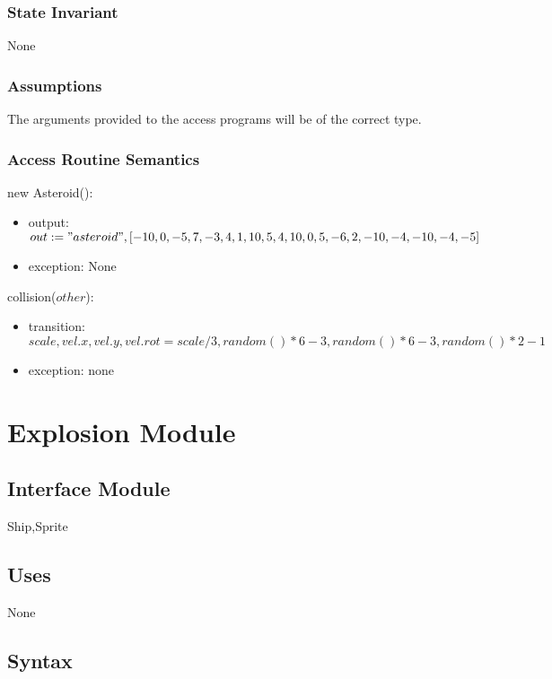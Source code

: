 \documentclass[12pt]{article}
\begin{document}
\subsubsection* {State Invariant}
None

\subsubsection* {Assumptions}

The arguments provided to the access programs will be of the correct type.

\subsubsection* {Access Routine Semantics}

\noindent new Asteroid():
\begin{itemize}
\item output: $out := "asteroid", [-10,   0,
              -5,   7,
              -3,   4,
               1,  10,
               5,   4,
              10,   0,
               5,  -6,
               2, -10,
              -4, -10,
              -4,  -5]$
\item exception: None
\end{itemize}

\noindent collision($other$):
\begin{itemize}
\item transition: $scale, vel.x, vel.y, vel.rot = scale/3,random() * 6 - 3, random() * 6 - 3, random() * 2 - 1$
\item exception: none
\end{itemize}

\newpage

\section* {Explosion Module}

\subsection*{Interface Module}

Ship,Sprite

\subsection* {Uses}

None

\subsection* {Syntax}
\end{document}
